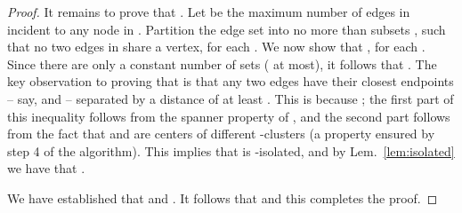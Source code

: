 \documentclass{llncs}
\newcommand{\ABox}{
\raisebox{3pt}{\framebox[6pt]{\rule{6pt}{0pt}}}
}
\begin{document}
\begin{proof}
It remains to prove that .
Let  be the maximum number of edges in  incident to any node in .
Partition the edge set  into no more than  subsets
, such that no two edges in  share a vertex, for each .
We now show that , for each . Since there are only a
constant number of sets  ( at most), it follows that .
The key observation to proving that  is that any two edges  have
their closest endpoints -- say,  and  --
separated by a distance of at least . This is because
;
the first part of this inequality follows from the spanner property of , and
the second part follows from the fact that  and  are centers of different
-clusters (a property ensured by step 4 of the algorithm). This implies that
 is -isolated, and by Lem.~\ref{lem:isolated} we have that
.

We have established that  and .
It follows that  and this completes the proof.
\hfill\ABox
\end{proof}
\end{document}
